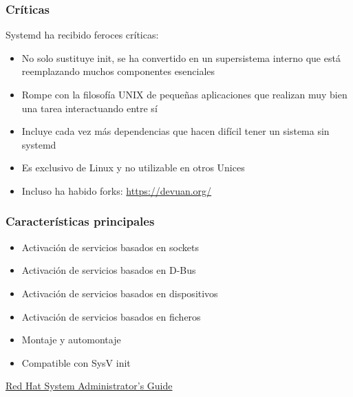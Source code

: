 \documentclass[aspectratio=169]{beamer}
\begin{document}
\begin{frame}
  \frametitle{Críticas}
  Systemd ha recibido feroces críticas:
  \begin{itemize}
  \item No solo sustituye init, se ha convertido en un supersistema interno que está reemplazando muchos componentes esenciales
  \item Rompe con la filosofía UNIX de pequeñas aplicaciones que realizan muy bien una tarea interactuando entre sí
  \item Incluye cada vez más dependencias que hacen difícil tener un sistema sin systemd
  \item Es exclusivo de Linux y no utilizable en otros Unices
  \item Incluso ha habido forks: \url{https://devuan.org/}
  \end{itemize}
\end{frame}

\begin{frame}
  \frametitle{Características principales}
  \begin{itemize}
  \item Activación de servicios basados en sockets
  \item Activación de servicios basados en D-Bus 
  \item Activación de servicios basados en dispositivos
  \item Activación de servicios basados en ficheros
  \item Montaje y automontaje
  \item Compatible con SysV init
  \end{itemize}
  \href{https://access.redhat.com/documentation/en-us/red_hat_enterprise_linux/7/html/system_administrators_guide/chap-managing_services_with_systemd}{Red Hat System Administrator's Guide}
\end{frame}
\end{document}
